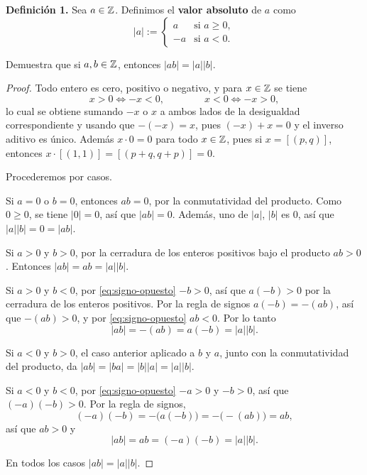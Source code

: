 \documentclass[12pt,a4paper]{article}
\begin{document}
    \textbf{Definición 1.} Sea $a\in\mathbb{Z}$. Definimos el \textbf{valor absoluto} de $a$ como
    \begin{equation*}
        |a|:=\begin{cases}
            a & \text{si } a\ge0,\\
            -a & \text{si } a<0.
        \end{cases}
    \end{equation*}

    \begin{problema}
        Demuestra que si $a,b\in\mathbb{Z}$, entonces $|ab|=|a||b|$.
    \end{problema}

    \begin{proof}
        Todo entero es cero, positivo o negativo, y para $x\in\mathbb{Z}$ se tiene
        \begin{equation}\label{eq:signo-opuesto}
            x>0 \iff -x<0, \qquad\qquad x<0 \iff -x>0,
        \end{equation}
        lo cual se obtiene sumando $-x$ o $x$ a ambos lados de la desigualdad correspondiente y usando que
        $-(-x)=x$, pues $(-x)+x=0$ y el inverso aditivo es único. Además $x\cdot0=0$ para todo $x\in\mathbb{Z}$, pues si $x=[(p,q)]$, entonces $x\cdot[(1,1)]=[(p+q,q+p)]=0$.

        Procederemos por casos.

        Si $a=0$ o $b=0$, entonces $ab=0$, por la conmutatividad del producto. Como $0\ge0$, se tiene $|0|=0$, así
        que $|ab|=0$. Además, uno de $|a|$, $|b|$ es $0$, así que $|a||b|=0=|ab|$.

        Si $a>0$ y $b>0$, por la cerradura de los enteros positivos bajo el producto $ab>0$. Entonces $|ab|=ab=|a||b|$.

        Si $a>0$ y $b<0$, por \eqref{eq:signo-opuesto} $-b>0$, así que $a(-b)>0$ por la cerradura de los enteros
        positivos. Por la regla de signos $a(-b)=-(ab)$, así que $-(ab)>0$, y por \eqref{eq:signo-opuesto} $ab<0$.
        Por lo tanto
        \begin{equation*}
            |ab|=-(ab)=a(-b)=|a||b|.
        \end{equation*}

        Si $a<0$ y $b>0$, el caso anterior aplicado a $b$ y $a$, junto con la conmutatividad del producto, da
        $|ab|=|ba|=|b||a|=|a||b|$.

        Si $a<0$ y $b<0$, por \eqref{eq:signo-opuesto} $-a>0$ y $-b>0$, así que $(-a)(-b)>0$. Por la regla de signos,
        \begin{equation*}
            (-a)(-b)=-\big(a(-b)\big)=-\big(-(ab)\big)=ab,
        \end{equation*}
        así que $ab>0$ y
        \begin{equation*}
            |ab|=ab=(-a)(-b)=|a||b|.
        \end{equation*}

        En todos los casos $|ab|=|a||b|$.
    \end{proof}
\end{document}

